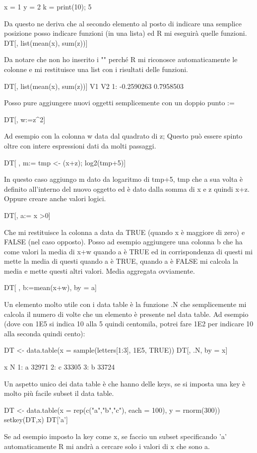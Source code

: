 {
	x = 1
	y = 2
}
k = {print(10); 5}


Da questo ne deriva che al secondo elemento al posto di indicare una semplice posizione
posso indicare funzioni (in una lista) ed R mi eseguirà quelle funzioni.
DT[, list(mean(x), sum(z))]

Da notare che non ho inserito i "" perché R mi riconosce automaticamente le colonne e mi restituisce una list con i risultati delle funzioni.

DT[, list(mean(x), sum(z))]
           V1        V2
1: -0.2590263 0.7958503


Posso pure aggiungere nuovi oggetti semplicemente con un doppio punto :=

DT[, w:=z^2]

Ad esempio con la colonna w data dal quadrato di z; Questo può essere spinto oltre con intere espressioni dati da molti passaggi.

DT[ , m:= {tmp <- (x+z); log2(tmp+5)}]

In questo caso aggiungo m dato da logaritmo di tmp+5, tmp che a sua volta è definito all'interno del nuovo oggetto ed è dato dalla somma di x e z quindi x+z.
Oppure creare anche valori logici.

DT[, a:= x >0]

Che mi restituisce la colonna a data da TRUE (quando x è maggiore di zero) e FALSE (nel caso opposto).
Posso ad esempio aggiungere una colonna b che ha come valori la media di x+w quando a è TRUE ed in corrispondenza di questi mi mette la media di questi quando a è TRUE, quando a è FALSE mi calcola la media e mette questi altri valori. Media aggregata ovviamente.

DT[ , b:=mean(x+w), by = a]

Un elemento molto utile con i data table è la funzione .N che semplicemente mi calcola
il numero di volte che un elemento è presente nel data table.
Ad esempio (dove con 1E5 si indica 10 alla 5 quindi centomila, potrei fare 1E2 per indicare 10 alla seconda quindi cento):

DT <- data.table(x = sample(letters[1:3], 1E5, TRUE))
DT[, .N, by = x]


   x     N
1: a 32971
2: c 33305
3: b 33724

Un aspetto unico dei data table è che hanno delle keys, se si imposta una key è molto più facile subset il data table.

DT <- data.table(x = rep(c("a","b","c"), each = 100), y = rnorm(300))
setkey(DT,x)
DT['a']

Se ad esempio imposto la key come x, se faccio un subset specificando 'a' automaticamente R mi andrà a cercare solo i valori di x che sono a.

